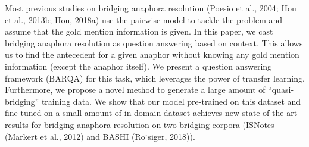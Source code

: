 Most previous studies on bridging anaphora resolution (Poesio et al., 2004; Hou et al., 2013b; Hou, 2018a) use the pairwise model to tackle the problem and assume that the gold mention information is given. In this paper, we cast bridging anaphora resolution as question answering based on context. This allows us to find the antecedent for a given anaphor without knowing any gold mention information (except the anaphor itself). We present a question answering framework (BARQA) for this task, which leverages the power of transfer learning. Furthermore, we propose a novel method to generate a large amount of ``quasi-bridging'' training data. We show that our model pre-trained on this dataset and fine-tuned on a small amount of in-domain dataset achieves new state-of-the-art results for bridging anaphora resolution on two bridging corpora (ISNotes (Markert et al., 2012) and BASHI (Ro ̈siger, 2018)).
